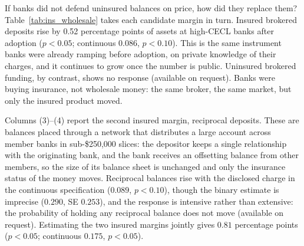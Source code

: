 If banks did not defend uninsured balances on price, how did they
replace them?  Table~\ref{tab:ins_wholesale} takes each candidate
margin in turn.  Insured brokered deposits rise by 0.52 percentage
points of assets at high-CECL banks after adoption ($p<0.05$;
continuous $0.086$, $p<0.10$).  This is the same instrument banks
were already ramping before adoption, on private knowledge of their
charges, and it continues to grow once the number is public.
Uninsured brokered funding, by contrast, shows no response (available
on request).  Banks were buying insurance, not wholesale money: the
same broker, the same market, but only the insured product moved.

Columns (3)--(4) report the second insured margin, reciprocal
deposits.  These are balances placed through a network that
distributes a large account across member banks in sub-\$250{,}000
slices: the depositor keeps a single relationship with the originating
bank, and the bank receives an offsetting balance from other members,
so the size of its balance sheet is unchanged and only the insurance
status of the money moves.  Reciprocal balances rise with the
disclosed charge in the continuous specification ($0.089$, $p<0.10$),
though the binary estimate is imprecise ($0.290$, SE $0.253$), and the
response is intensive rather than extensive: the probability of
holding any reciprocal balance does not move (available on request).
Estimating the two insured margins jointly gives $0.81$ percentage
points ($p<0.05$; continuous $0.175$, $p<0.05$).

